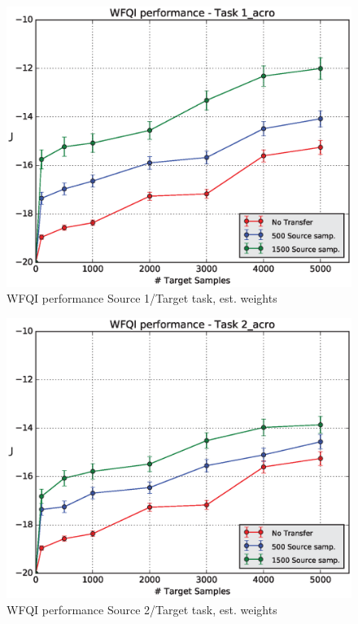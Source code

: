     \begin{figure}[H]
      \raggedbottom
      \centering
      \includegraphics[scale=0.5]{images/WFQIPerf1_acro.eps}
      \caption{WFQI performance Source 1/Target task, est. weights}
      \label{acro1}
    \end{figure}
    \begin{figure}[H]
      \raggedbottom
      \centering
      \includegraphics[scale=0.5]{images/WFQIPerf2_acro.eps}
      \caption{WFQI performance Source 2/Target task, est. weights}
      \label{acro2}
    \end{figure}
